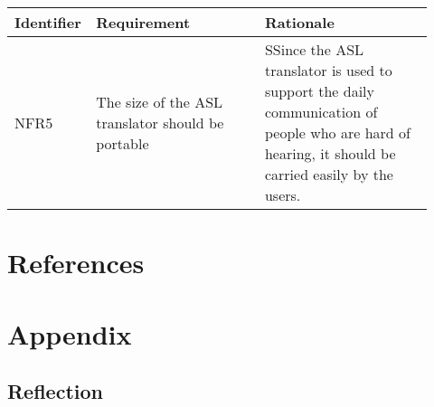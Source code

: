 \documentclass[12pt]{article}
\begin{document}
\renewcommand{\arraystretch}{1.2}
\noindent \begin{tabularx}{\textwidth}{p{0.12\linewidth}|p{0.4\linewidth}|p{0.4\linewidth}}
\toprule
\textbf{Identifier} & \textbf{Requirement} & \textbf{Rationale}\\
\midrule
NFR5
& The size of the ASL translator should be portable
& SSince the ASL translator is used to support the daily communication of people who are hard of hearing, it should be carried easily by the users.
\\

\bottomrule
\end{tabularx}

\section{References}

\section{Appendix}
\subsection{Reflection}
\end{document}
